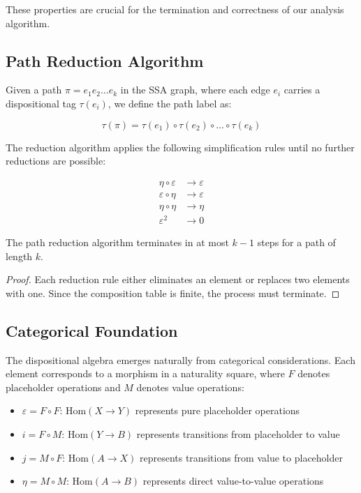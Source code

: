 \documentclass[journal]{IEEEtran}
\begin{document}
These properties are crucial for the termination and correctness of our analysis algorithm.

\subsection{Path Reduction Algorithm}

Given a path $\pi = e_1 e_2 \ldots e_k$ in the SSA graph, where each edge $e_i$ carries a dispositional tag $\tau(e_i)$, we define the path label as:

\begin{equation}
\tau(\pi) = \tau(e_1) \circ \tau(e_2) \circ \ldots \circ \tau(e_k)
\end{equation}

The reduction algorithm applies the following simplification rules until no further reductions are possible:

\begin{align}
\eta \circ \varepsilon &\to \varepsilon \\
\varepsilon \circ \eta &\to \varepsilon \\
\eta \circ \eta &\to \eta \\
\varepsilon^2 &\to 0
\end{align}

\begin{theorem}[Termination]
The path reduction algorithm terminates in at most $k-1$ steps for a path of length $k$.
\end{theorem}

\begin{proof}
Each reduction rule either eliminates an element or replaces two elements with one. Since the composition table is finite, the process must terminate.
\end{proof}

\subsection{Categorical Foundation}

The dispositional algebra emerges naturally from categorical considerations. Each element corresponds to a morphism in a naturality square, where $F$ denotes placeholder operations and $M$ denotes value operations:

\begin{itemize}
\item $\varepsilon = F \circ F$: $\text{Hom}(X \to Y)$ represents pure placeholder operations
\item $i = F \circ M$: $\text{Hom}(Y \to B)$ represents transitions from placeholder to value
\item $j = M \circ F$: $\text{Hom}(A \to X)$ represents transitions from value to placeholder  
\item $\eta = M \circ M$: $\text{Hom}(A \to B)$ represents direct value-to-value operations
\end{itemize}
\end{document}
